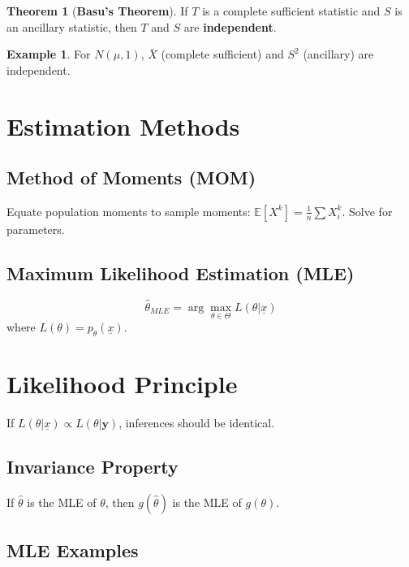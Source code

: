 \documentclass[12pt, a4paper]{article}
\theoremstyle{definition}
\newtheorem{example}{Example}
\newtheorem{theorem}{Theorem}
\newcommand{\E}{\mathbb{E}}
\newcommand{\xvec}{\underline{x}}
\begin{document}
\begin{theorem}[\textbf{Basu's Theorem}]
If $T$ is a complete sufficient statistic and $S$ is an ancillary statistic, then $T$ and $S$ are \textbf{independent}.
\end{theorem}
\begin{example}
For $N(\mu, 1)$, $\bar{X}$ (complete sufficient) and $S^2$ (ancillary) are independent.
\end{example}

\section{Estimation Methods}
\subsection{Method of Moments (MOM)}
Equate population moments to sample moments: $\E[X^k] = \frac{1}{n}\sum X_i^k$. Solve for parameters.

\subsection{Maximum Likelihood Estimation (MLE)}
$$ \hat{\theta}_{MLE} = \arg\max_{\theta \in \Theta} L(\theta | \xvec) $$
where $L(\theta) = p_\theta(\xvec)$.

\section{Likelihood Principle}
If $L(\theta | \xvec) \propto L(\theta | \mathbf{y})$, inferences should be identical.

\subsection{Invariance Property}
If $\hat{\theta}$ is the MLE of $\theta$, then $g(\hat{\theta})$ is the MLE of $g(\theta)$.

\subsection{MLE Examples}
\end{document}
